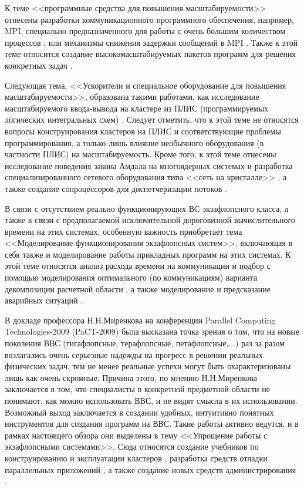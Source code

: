  К теме <<программные средства для повышения масштабируемости>> отнесены разработки коммуникационного программного обеспечения, например, MPI, специально предназначенного для работы с очень большим количеством процессов \cite{Zounmevo2014265}, или механизмы снижения задержки сообщений в MPI \cite{Khunjush2009430}. Также к этой теме относится создание высокомасштабируемых пакетов программ для решения конкретных задач \cite{Valiev20101477,Peng20131469}.
 
 Следующая тема, <<Ускорители и специальное оборудование для повышения масштабируемости>>, образована такими работами, как исследование масштабируемого ввода-вывода на кластере из ПЛИС (программируемых логических интегральных схем) \cite{Schmidt2012344}. Следует отметить, что к этой теме не относятся вопросы конструирования кластеров на ПЛИС и соответствующие проблемы программирования, а только лишь влияние необычного оборудования (в частности ПЛИС) на масштабируемость. Кроме того, к этой теме отнесены исследование поведения закона Амдала \cite{Amdahl} на многоядерных системах \cite{Yavits2014} и разработка специализированного сетевого оборудования типа <<сеть на кристалле>>  \cite{Khanjari2015403}, а также создание
 сопроцессоров для диспетчеризации потоков \cite{Giorgi2015100}.
 
 В связи с отсутствием реально функционирующих ВС экзафлопсного класса, а также в связи с предполагаемой исключительной дороговизной вычислительного времени на этих системах, особенную важность приобретает тема  <<Моделирование функционирования экзафлопсных систем>>, включающая в себя также	 и моделирование работы прикладных программ на этих системах. К этой теме относятся анализ расхода времени на коммуникации \cite{Siegel20123119} и подбор с помощью моделирования оптимального (по коммуникациям) варианта декомпозиции расчетной области \cite{Hag2015400}, а также моделирование и предсказание аварийных ситуаций \cite{Aupy20142048}.

 В докладе профессора Н.Н.Миренкова на конференции Parallel Computing Technologies-2009 (PaCT-2009) \cite{Watanobe2009} была высказана точка зрения о том, что на новые поколения ВВС (гигафлопсные, терафлопсные, петафлопсные,...) раз за разом возлагались очень серьезные надежды на прогресс в решении реальных физических задач, тем не менее реальные успехи могут быть охарактеризованы лишь как очень скромные. Причина этого, по мнению Н.Н.Миренкова \cite{Watanobe2009} заключается в том, что специалисты в конкретной предметной области не понимают, как можно использовать ВВС, и не видят смысла в их использовании. Возможный выход заключается в создании удобных, интуитивно понятных инструментов для создания программ на ВВС. Такие работы активно ведутся, и в рамках настоящего обзора они выделены в тему <<Упрощение работы с  экзафлопсными системами>>. Сюда относятся создание учебников по конструированию и эксплуатации кластеров \cite{Georgi20111917}, разработка средств отладки параллельных приложений \cite{Jin20131774,Huenich20151383}, а также создание новых средств администрирования \cite{Gallard2012136}.
 
